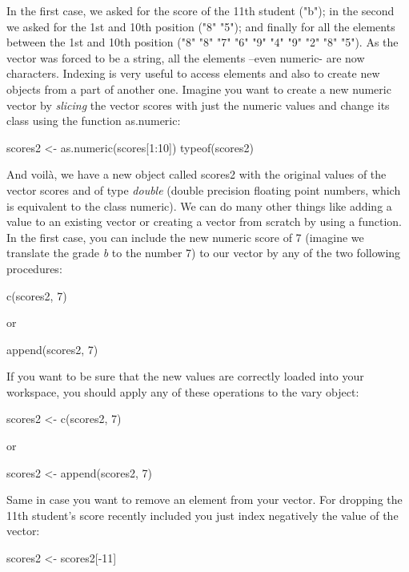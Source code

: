 In the first case, we asked for the score of the 11th student ("b"); in the second we asked for the 1st and 10th position ("8"  "5"); and finally for all the elements between the 1st and 10th position ("8" "8" "7" "6" "9" "4" "9" "2" "8" "5"). As the vector was forced to be a string, all the elements –even numeric- are now characters. Indexing is very useful to access elements and also to create new objects from a part of another one. Imagine you want to create a new numeric vector by \emph{slicing} the vector scores with just the numeric values and change its class using the function as.numeric:

\begin{exampler}
scores2 <- as.numeric(scores[1:10])
typeof(scores2)
\end{exampler}

And voilà, we have a new object called scores2 with the original values of the vector scores and of type \emph{double} (double precision floating point numbers, which is equivalent to the class numeric).  We can do many other things like adding a value to an existing vector or creating a vector from scratch by using a function. In the first case, you can include the new numeric score of 7 (imagine we translate the grade \emph{b} to the number 7) to our vector by any of the two following procedures:

\begin{exampler}
c(scores2, 7)
\end{exampler}

or

\begin{exampler}
append(scores2, 7)
\end{exampler}

If you want to be sure that the new values are correctly loaded into your workspace, you should apply any of these operations to the vary object:

\begin{exampler}
scores2 <- c(scores2, 7)
\end{exampler}

or

\begin{exampler}
scores2 <- append(scores2, 7)
\end{exampler}

Same in case you want to remove an element from your vector. For dropping the 11th student's score recently included you just index negatively the value of the vector:

\begin{exampler}
scores2 <- scores2[-11]
\end{exampler}

